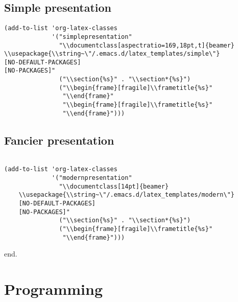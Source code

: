 \documentclass[12pt]{article}
\begin{document}
\subsection{Simple presentation}
\label{sec:org01e4d7a}

\begin{verbatim}
(add-to-list 'org-latex-classes
             '("simplepresentation"
               "\\documentclass[aspectratio=169,18pt,t]{beamer}
\\usepackage{\\string~\"/.emacs.d/latex_templates/simple\"}
[NO-DEFAULT-PACKAGES]
[NO-PACKAGES]"
               ("\\section{%s}" . "\\section*{%s}")
               ("\\begin{frame}[fragile]\\frametitle{%s}"
                "\\end{frame}"
                "\\begin{frame}[fragile]\\frametitle{%s}"
                "\\end{frame}")))
\end{verbatim}

\subsection{Fancier presentation}
\label{sec:orge2625c9}

\begin{verbatim}

(add-to-list 'org-latex-classes
             '("modernpresentation"
               "\\documentclass[14pt]{beamer}
    \\usepackage{\\string~\"/.emacs.d/latex_templates/modern\"}
    [NO-DEFAULT-PACKAGES]
    [NO-PACKAGES]"
               ("\\section{%s}" . "\\section*{%s}")
               ("\\begin{frame}[fragile]\\frametitle{%s}"
                "\\end{frame}")))

\end{verbatim}
end. 

\section{Programming}
\label{sec:org3039576}
\end{document}
